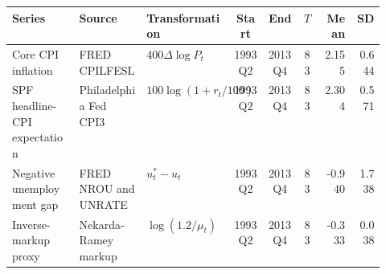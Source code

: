 \begin{tabular}{@{}p{0.18\linewidth}p{0.18\linewidth}p{0.18\linewidth}cccrr@{}}
\toprule
Series & Source & Transformation & Start & End & $T$ & Mean & SD \\
\midrule
Core CPI inflation & FRED CPILFESL & $400\Delta\log P_t$ & 1993Q2 & 2013Q4 & 83 & 2.155 & 0.644 \\
SPF headline-CPI expectation & Philadelphia Fed CPI3 & $100\log(1+r_t/100)$ & 1993Q2 & 2013Q4 & 83 & 2.304 & 0.571 \\
Negative unemployment gap & FRED NROU and UNRATE & $u_t^*-u_t$ & 1993Q2 & 2013Q4 & 83 & -0.940 & 1.738 \\
Inverse-markup proxy & Nekarda-Ramey markup & $\log(1.2/\mu_t)$ & 1993Q2 & 2013Q4 & 83 & -0.333 & 0.038 \\
\bottomrule
\end{tabular}

